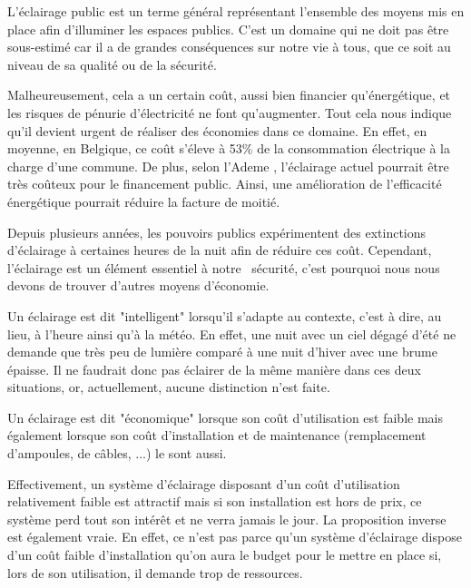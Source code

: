  
 
 
 
 L'\'eclairage public est un terme g\'en\'eral repr\'esentant l'ensemble des moyens mis en place afin d'illuminer les espaces publics. C'est un domaine qui ne doit pas \^etre sous-estim\'e car il a de grandes cons\'equences sur notre vie \`a tous, que ce soit au niveau de sa qualit\'e ou de la s\'ecurit\'e. \cite{projwebsite}


Malheureusement, cela a un certain co\^ut, aussi bien financier qu'\'energ\'etique, et  les risques de p\'enurie d'\'electricit\'e ne font qu'augmenter. Tout cela nous indique qu'il devient urgent de r\'ealiser des \'economies dans ce domaine. En effet, en moyenne, en Belgique, ce co\^ut  s'\'eleve \`a 53\% de la consommation \'electrique \`a la charge d'une commune. De plus, selon l'Ademe \cite{ademe}, l'\'eclairage actuel pourrait \^etre tr\`es co\^uteux pour le financement public. Ainsi, une am\'elioration de l'efficacit\'e \'energ\'etique pourrait r\'eduire la facture de moiti\'e.


Depuis plusieurs ann\'ees, les pouvoirs publics exp\'erimentent des extinctions d'\'eclairage \`a certaines heures de la nuit afin de r\'eduire ces co\^ut. Cependant, l'\'eclairage est un élément essentiel \`a notre \ s\'ecurit\'e, c'est pourquoi nous nous devons de trouver d'autres moyens d'\'economie.

Un \'eclairage est dit "intelligent" lorsqu'il s'adapte au contexte, c'est à dire, au lieu, à l'heure ainsi qu'\`a la m\'et\'eo. En effet, une nuit avec un ciel d\'egag\'e d'\'et\'e ne demande que tr\`es peu de lumi\`ere comparé à une nuit d'hiver avec une brume \'epaisse. Il ne faudrait donc pas éclairer de la même manière dans ces deux situations, or, actuellement, aucune distinction n'est faite. 

Un \'eclairage est dit "\'economique" lorsque son co\^ut d'utilisation est faible mais également lorsque son co\^ut d'installation et de maintenance (remplacement d'ampoules, de c\^ables, ...) le sont aussi.

Effectivement, un système d'\'eclairage disposant d'un co\^ut d'utilisation relativement faible est attractif mais si son installation est hors de prix, ce système perd tout son intérêt et ne verra jamais le jour. La proposition inverse est également vraie. En effet, ce n'est pas parce qu'un système d'éclairage dispose d'un coût faible d'installation qu'on aura le budget pour le mettre en place si, lors de son utilisation, il demande trop de ressources.


